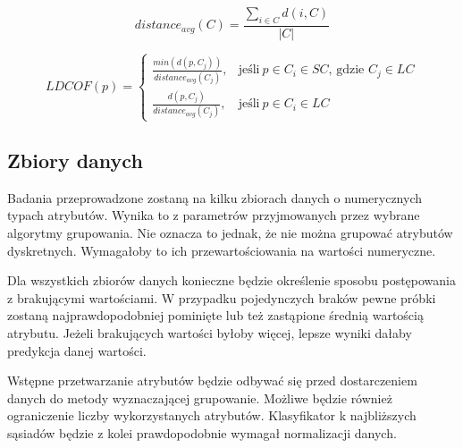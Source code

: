 \documentclass[11pt,a4paper,twoside]{article}
\begin{document}
\begin{equation}
distance_{avg}(C) = \frac{\sum_{i \in C} d(i,C)}{|C|}
\end{equation}

\begin{equation}
LDCOF(p) = \begin{cases}
   \frac{min(d(p,C_{j}))}{distance_{avg}(C_{j})}, & \text{jeśli}\ p \in C_{i} \in SC \text{, gdzie } C_{j} \in LC\\
    \frac{d(p,C_{j})}{distance_{avg}(C_{j})}, & \text{jeśli}\ p \in C_{i} \in LC
  \end{cases}
\end{equation}


\subsection{Zbiory danych}

Badania przeprowadzone zostaną na kilku zbiorach danych o numerycznych typach atrybutów. Wynika to z parametrów przyjmowanych przez wybrane algorytmy grupowania. Nie oznacza to jednak, że nie można grupować atrybutów dyskretnych. Wymagałoby to ich przewartościowania na wartości numeryczne.

Dla wszystkich zbiorów danych konieczne będzie określenie sposobu postępowania z brakującymi wartościami. W przypadku pojedynczych braków pewne próbki zostaną najprawdopodobniej pominięte lub też zastąpione średnią wartością atrybutu. Jeżeli brakujących wartości byłoby więcej, lepsze wyniki dałaby predykcja danej wartości.

Wstępne przetwarzanie atrybutów będzie odbywać się przed dostarczeniem danych do metody wyznaczającej grupowanie. Możliwe będzie również ograniczenie liczby wykorzystanych atrybutów. Klasyfikator k najbliższych sąsiadów będzie z kolei prawdopodobnie wymagał normalizacji danych. 
\end{document}
